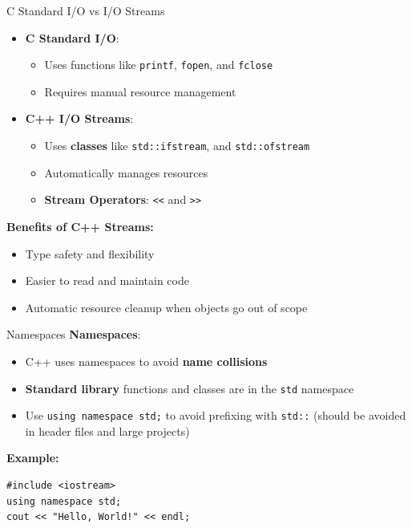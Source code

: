 \begin{frame}[fragile]{ C Standard I/O vs I/O Streams}
    \begin{itemize}
        \item \textbf{C Standard I/O}:
            \begin{itemize}
                \item Uses functions like \texttt{printf}, \texttt{fopen}, and \texttt{fclose}
                \item Requires manual resource management
            \end{itemize}
        \item \textbf{C++ I/O Streams}:
            \begin{itemize}
                \item Uses \textbf{classes} like \texttt{std::ifstream}, and \texttt{std::ofstream}
                \item Automatically manages resources
                \item \textbf{Stream Operators}: \texttt{<<} and \texttt{>>}
            \end{itemize}
    \end{itemize}
    \vspace{0.5em}
    \textbf{Benefits of C++ Streams:}
    \begin{itemize}
        \item Type safety and flexibility
        \item Easier to read and maintain code
        \item Automatic resource cleanup when objects go out of scope
    \end{itemize}
\end{frame}

\begin{frame}[fragile]{ Namespaces}
    \textbf{Namespaces}:
    \begin{itemize}
        \item C++ uses namespaces to avoid \textbf{name collisions}
        \item \textbf{Standard library} functions and classes are in the \texttt{std} namespace
        \item Use \texttt{using namespace std;} to avoid prefixing with \texttt{std::} (should be avoided in header files and large projects)
    \end{itemize}
    \textbf{Example:}
    \begin{verbatim}
#include <iostream>
using namespace std;
cout << "Hello, World!" << endl;
        \end{verbatim}
\end{frame}

